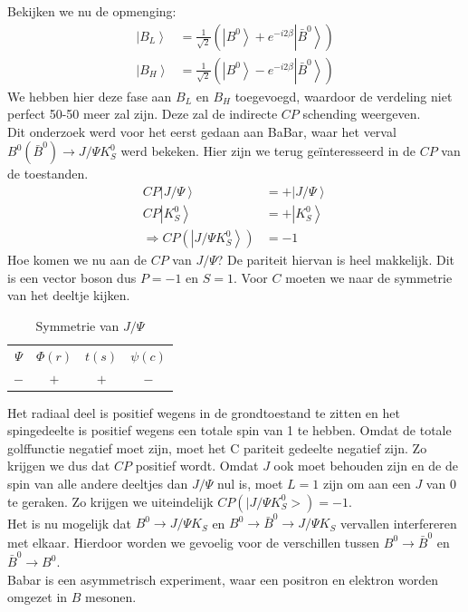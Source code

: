 \documentclass[../main.tex]{subfiles}
\begin{document}
Bekijken we nu de opmenging:
\begin{equation}
    \begin{aligned}
        \label{eq:b_opmenging}
        \left| B_{L}\right>&=\frac{1}{\sqrt{2}}\left(\left|B^{0}\right>+e^{-i 2 \beta}\left| \bar{B}^{0}\right>\right) \\
        \left| B_{H}\right>&=\frac{1}{\sqrt{2}}\left(\left|B^{0}\right>-e^{-i 2 \beta}\left| \bar{B}^{0}\right>\right)
    \end{aligned}
\end{equation}
We hebben hier deze fase aan $B_L$ en $B_H$ toegevoegd, waardoor de verdeling niet perfect 50-50 meer zal zijn. Deze zal de indirecte $CP$ schending weergeven.\\
Dit onderzoek werd voor het eerst gedaan aan BaBar, waar het verval $B^{0}\left(\bar{B}^{0}\right) \rightarrow J / \Psi K_{S}^{0}$ werd bekeken. Hier zijn we terug geïnteresseerd in de $CP$ van de toestanden.
\begin{equation}
    \begin{aligned}
        \label{eq:cp_toestanden}
        C P\left|J / \Psi\right>&=+\left| J / \Psi\right>\\
        C P\left|K_{S}^{0}\right>&=+\left| K_{S}^{0}\right>\\
        \Rightarrow C P\left(\left| J / \Psi K_{S}^{0}\right>\right)&=-1
    \end{aligned}
\end{equation}
Hoe komen we nu aan de $CP$ van $J / \Psi$? De pariteit hiervan is heel makkelijk. Dit is een vector boson dus $P=-1$ en $S=1$. Voor $C$ moeten we naar de symmetrie van het deeltje kijken.

\begin{table}[h]
    \centering
    \caption{Symmetrie van $J / \Psi$}
    \label{tab:label}
    \begin{tabular}{cccc}
        $\Psi$ & $\Phi(r)$ & $t(s)$ & $\psi(c)$ \\
        $-$    & $+$       & $+$    & $-$
    \end{tabular}
\end{table}

Het radiaal deel is positief wegens in de grondtoestand te zitten en het spingedeelte is positief wegens een totale spin van 1 te hebben. Omdat de totale golffunctie negatief moet zijn, moet het C pariteit gedeelte negatief zijn. Zo krijgen we dus dat $CP$ positief wordt. Omdat $J$ ook moet behouden zijn en de de spin van alle andere deeltjes dan $J / \Psi$ nul is, moet $L=1$ zijn om aan een $J$ van 0 te geraken. Zo krijgen we uiteindelijk $C P\left(\mid J / \Psi K_{S}^{0}>\right)=-1$.\\
Het is nu mogelijk dat $B^{0} \rightarrow J / \Psi K_{S}$ en $B^{0} \rightarrow \bar{B}^{0} \rightarrow J / \Psi K_{S}$ vervallen interfereren met elkaar. Hierdoor worden we gevoelig voor de verschillen tussen $B^{0} \rightarrow \bar{B}^{0}$ en $\bar{B}^{0} \rightarrow B^{0}$.\\
Babar is een asymmetrisch experiment, waar een positron en elektron worden omgezet in $B$ mesonen.
\end{document}
